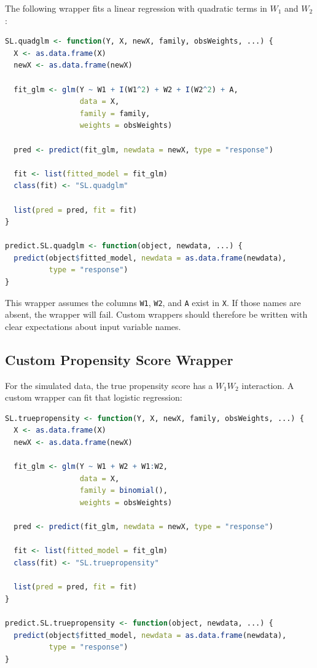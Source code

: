 The following wrapper fits a linear regression with quadratic terms in $W_1$ and
$W_2$:

\begin{implementationbox}
\begin{lstlisting}[language=R]
SL.quadglm <- function(Y, X, newX, family, obsWeights, ...) {
  X <- as.data.frame(X)
  newX <- as.data.frame(newX)

  fit_glm <- glm(Y ~ W1 + I(W1^2) + W2 + I(W2^2) + A,
                 data = X,
                 family = family,
                 weights = obsWeights)

  pred <- predict(fit_glm, newdata = newX, type = "response")

  fit <- list(fitted_model = fit_glm)
  class(fit) <- "SL.quadglm"

  list(pred = pred, fit = fit)
}

predict.SL.quadglm <- function(object, newdata, ...) {
  predict(object$fitted_model, newdata = as.data.frame(newdata),
          type = "response")
}
\end{lstlisting}
\end{implementationbox}

This wrapper assumes the columns \texttt{W1}, \texttt{W2}, and \texttt{A} exist in
\texttt{X}. If those names are absent, the wrapper will fail. Custom wrappers should
therefore be written with clear expectations about input variable names.

\subsection{Custom Propensity Score Wrapper}

For the simulated data, the true propensity score has a $W_1W_2$ interaction. A custom
wrapper can fit that logistic regression:

\begin{implementationbox}
\begin{lstlisting}[language=R]
SL.truepropensity <- function(Y, X, newX, family, obsWeights, ...) {
  X <- as.data.frame(X)
  newX <- as.data.frame(newX)

  fit_glm <- glm(Y ~ W1 + W2 + W1:W2,
                 data = X,
                 family = binomial(),
                 weights = obsWeights)

  pred <- predict(fit_glm, newdata = newX, type = "response")

  fit <- list(fitted_model = fit_glm)
  class(fit) <- "SL.truepropensity"

  list(pred = pred, fit = fit)
}

predict.SL.truepropensity <- function(object, newdata, ...) {
  predict(object$fitted_model, newdata = as.data.frame(newdata),
          type = "response")
}
\end{lstlisting}
\end{implementationbox}

